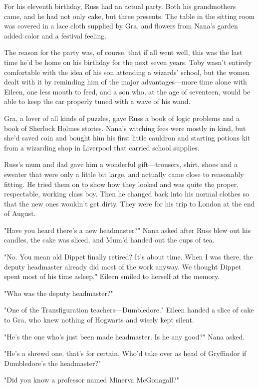 For his eleventh birthday, Russ had an actual party. Both his grandmothers came, and he had not only cake, but three presents. The table in the sitting room was covered in a lace cloth supplied by Gra, and flowers from Nana's garden added color and a festival feeling.

The reason for the party was, of course, that if all went well, this was the last time he'd be home on his birthday for the next seven years. Toby wasn't entirely comfortable with the idea of his son attending a wizards' school, but the women dealt with it by reminding him of the major advantages—more time alone with Eileen, one less mouth to feed, and a son who, at the age of seventeen, would be able to keep the car properly tuned with a wave of his wand.

Gra, a lover of all kinds of puzzles, gave Russ a book of logic problems and a book of Sherlock Holmes stories. Nana's witching fees were mostly in kind, but she'd saved coin and bought him his first little cauldron and starting potions kit from a wizarding shop in Liverpool that carried school supplies.

Russ's mum and dad gave him a wonderful gift—trousers, shirt, shoes and a sweater that were only a little bit large, and actually came close to reasonably fitting. He tried them on to show how they looked and was quite the proper, respectable, working class boy. Then he changed back into his normal clothes so that the new ones wouldn't get dirty. They were for his trip to London at the end of August.

"Have you heard there's a new headmaster?" Nana asked after Russ blew out his candles, the cake was sliced, and Mum'd handed out the cups of tea.

"No. You mean old Dippet finally retired? It's about time. When I was there, the deputy headmaster already did most of the work anyway. We thought Dippet spent most of his time asleep." Eileen smiled to herself at the memory.

"Who was the deputy headmaster?"

"One of the Transfiguration teachers—Dumbledore." Eileen handed a slice of cake to Gra, who knew nothing of Hogwarts and wisely kept silent.

"He's the one who's just been made headmaster. Is he any good?" Nana asked.

"He's a shrewd one, that's for certain. Who'd take over as head of Gryffindor if Dumbledore's the headmaster?"

"Did you know a professor named Minerva McGonagall?"

